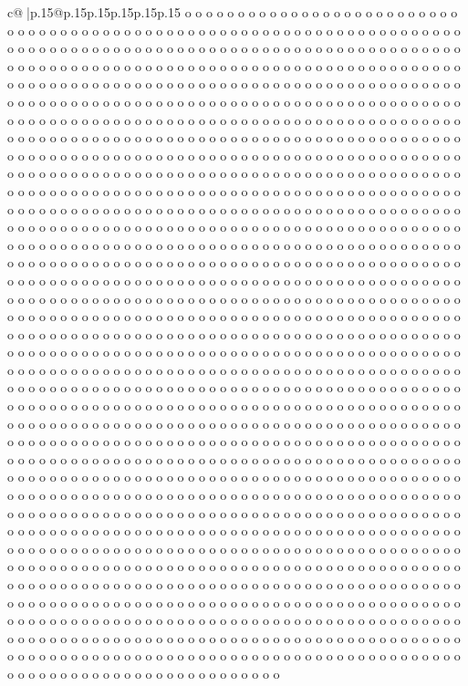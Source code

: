 \documentclass{article}
\begin{document}
{\begin{supertabular}{c@{$\;$}|p{.15\linewidth}@{}p{.15\linewidth}p{.15\linewidth}p{.15\linewidth}p{.15\linewidth}p{.15\linewidth}}
{{{o o o o o o o o o o o o o o o o o o o o o o o o o o o o o o o o o o o o o o o o o o o o o o o o o o o o o o o o o o o o o o o o o o o o o o o o o o o o o o o o o o o o o o o o o o o o o o o o o o o o o o o o o o o o o o o o o o o o o o o o o o o o o o o o o o o o o o o o o o o o o o o o o o o o o o o o o o o o o o o o o o o o o o o o o o o o o o o o o o o o o o o o o o o o o o o o o o o o o o o o o o o o o o o o o o o o o o o o o o o o o o o o o o o o o o o o o o o o o o o o o o o o o o o o o o o o o o o o o o o o o o o o o o o o o o o o o o o o o o o o o o o o o o o o o o o o o o o o o o o o o o o o o o o o o o o o o o o o o o o o o o o o o o o o o o o o o o o o o o o o o o o o o o o o o o o o o o o o o o o o o o o o o o o o o o o o o o o o o o o o o o o o o o o o o o o o o o o o o o o o o o o o o o o o o o o o o o o o o o o o o o o o o o o o o o o o o o o o o o o o o o o o o o o o o o o o o o o o o o o o o o o o o o o o o o o o o o o o o o o o o o o o o o o o o o o o o o o o o o o o o o o o o o o o o o o o o o o o o o o o o o o o o o o o o o o o o o o o o o o o o o o o o o o o o o o o o o o o o o o o o o o o o o o o o o o o o o o o o o o o o o o o o o o o o o o o o o o o o o o o o o o o o o o o o o o o o o o o o o o o o o o o o o o o o o o o o o o o o o o o o o o o o o o o o o o o o o o o o o o o o o o o o o o o o o o o o o o o o o o o o o o o o o o o o o o o o o o o o o o o o o o o o o o o o o o o o o o o o o o o o o o o o o o o o o o o o o o o o o o o o o o o o o o o o o o o o o o o o o o o o o o o o o o o o o o o o o o o o o o o o o o o o o o o o o o o o o o o o o o o o o o o o o o o o o o o o o o o o o o o o o o o o o o o o o o o o o o o o o o o o o o o o o o o o o o o o o o o o o o o o o o o o o o o o o o o o o o o o o o o o o o o o o o o o o o o o o o o o o o o o o o o o o o o o o o o o o o o o o o o o o o o o o o o o o o o o o o o o o o o o o o o o o o o o o o o o o o o o o o o o o o o o o o o o o o o o o o o o o o o o o o o o o o o o o o o o o o o o o o o o o o o o o o o o o o o o o o o o o o o o o o o o o o o o o o o o o o o o o o o o o o o o o o o o o o o o o o o o o o o o o o o o o o o o o o o o o o o o o o o o o o o o o o o o o o o o o o o o o o o o o o o o o o o o o o o o o o o o o o o o o o o o o o o o o o o o o o o o o o o o o o o o o o o o o o o o o o o o o o o o o o o o o o o o o o o o o o o o o o o o o o o o o o o o o o o o o o o o o o o o o o o o o o o o o o o o o o o o o o o o o o o o o o o o o o o o o o o o o o o o o o o o o o o o o o o o o o o o o o o o o o o o o o o o o o o o o o o o o o o o o o o o o o o o o o o o o o o o o o o o o o o o o o o o o o o o o o o o o o o o o o o o o o o o o o o o o o o o o o o o o o o o o o o o o o o o o o o o o o o o o o o o o o o o o o o o o o o o o o o o o o o o o o o o o o o o o o o o o o o o o o o o o o o o o o o o o o o o o o o o o o o o o o o o o o o o o o o o o o o o o o o o o o o o o o o o o o o o o o o o o o o o o o o o o o o o o o o o o o o o o o o o o o o o o o o o o o o o o o o o o o o o o o o o o o o o o o o o o o o o o o o o o o o o o o o o o o o o o o o o o o o o o o o o o o o o o o o o o o o o o o o o o o o o o o o o o o o o o o o o o o o o o o o o o o o o o o o o o o o }}}
\end{supertabular}}
\end{document}
